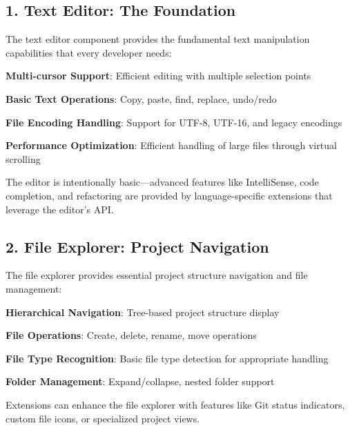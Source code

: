 \subsection*{1. Text Editor: The Foundation}

The text editor component provides the fundamental text manipulation capabilities that every developer needs:

\begin{compactlist}
    \item \textbf{Multi-cursor Support}: Efficient editing with multiple selection points
    \item \textbf{Basic Text Operations}: Copy, paste, find, replace, undo/redo
    \item \textbf{File Encoding Handling}: Support for UTF-8, UTF-16, and legacy encodings
    \item \textbf{Performance Optimization}: Efficient handling of large files through virtual scrolling
\end{compactlist}

\begin{successbox}
The editor is intentionally basic—advanced features like IntelliSense, code completion, and refactoring are provided by language-specific extensions that leverage the editor's API.
\end{successbox}

\subsection*{2. File Explorer: Project Navigation}

The file explorer provides essential project structure navigation and file management:

\begin{compactlist}
    \item \textbf{Hierarchical Navigation}: Tree-based project structure display
    \item \textbf{File Operations}: Create, delete, rename, move operations
    \item \textbf{File Type Recognition}: Basic file type detection for appropriate handling
    \item \textbf{Folder Management}: Expand/collapse, nested folder support
\end{compactlist}

Extensions can enhance the file explorer with features like Git status indicators, custom file icons, or specialized project views.

